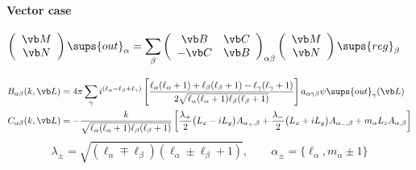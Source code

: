 \documentclass[letterpaper]{article}
\begin{document}

\paragraph{Vector case}

\begin{align*}
 \left(\begin{array}{c}
   \vb M \\ \vb N
 \end{array}\right)\sups{out}_\alpha
&= 
 \sum_{\beta}
 \left(\begin{array}{cc}
   \vb B & \vb C \\ 
  -\vb C & \vb B
 \end{array}\right)_{\alpha\beta} 
 \left(\begin{array}{c}
   \vb M \\ \vb N 
 \end{array}\right)\sups{reg}_\beta
\end{align*}

\begin{align*}
 B_{\alpha\beta}(k, \vb L)
&=4\pi 
  \sum_\gamma i^{(\ell_\alpha - \ell_\beta + \ell_\gamma)}
  \left[\frac{\ell_\alpha(\ell_\alpha + 1) + \ell_\beta(\ell_\beta + 1) 
               -\ell_\gamma(\ell_\gamma+ 1)
             }
             {2\sqrt{\ell_\alpha(\ell_\alpha+1)\ell_\beta (\ell_\beta+1)}}
  \right]
  a_{\alpha\gamma\beta} 
  \psi\sups{out}_\gamma(\vb L)
\\
 C_{\alpha\beta}(k, \vb L)
&=-\frac{k}{\sqrt{\ell_\alpha(\ell_\alpha+1)\ell_\beta(\ell_\beta+1)}}
   \left[ \frac{\lambda_+}{2}\big(L_x - iL_y\big)A_{\alpha_+, \beta} 
         +\frac{\lambda_-}{2}\big(L_x + iL_y\big)A_{\alpha_-, \beta} 
         +           m_\alpha L_z A_{\alpha, \beta} 
   \right]
\end{align*}
$$ \lambda_\pm = \sqrt{ (\ell_\alpha \mp \ell_\beta)
                        (\ell_\alpha \pm \ell_\beta+1)
                      },
   \qquad
   \alpha_\pm = \{\ell_\alpha, m_\alpha \pm 1\}
$$
   


\newpage
\end{document}
